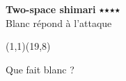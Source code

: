 \documentclass[preview, border=0pt, varwidth=false]{standalone}
\begin{document}
	\setgounit{0.5cm} 
	
	\parbox[c][14.65cm][c]{10.2cm}{
		\centering
		
		{\Large \textbf{Two-space shimari} $\medblackstar \medblackstar \medblackstar \medblackstar$  \\ Blanc répond à l'attaque} 
		\vspace{3em}
		
		\begin{psgopartialboard}{(1,1)(19,8)}
			\pass
		\end{psgopartialboard}
		
		\vspace{1em}
		Que fait blanc ?
	}
	
\end{document}

